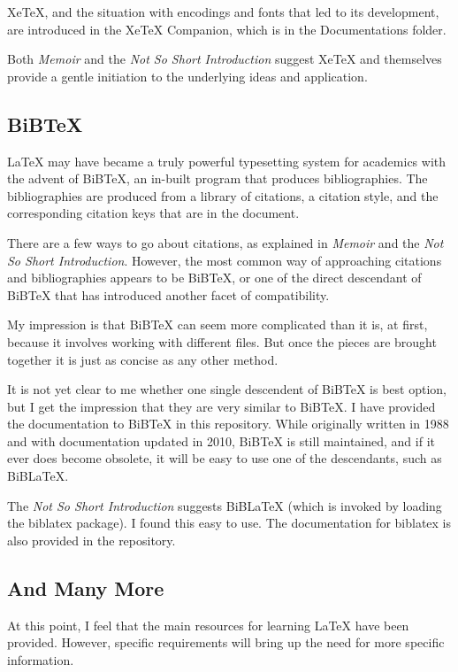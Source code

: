 \documentclass[11pt, oneside]{memoir}
\begin{document}
XeTeX, and the situation with encodings and fonts that led to its development, are introduced in the XeTeX Companion, which is in the Documentations folder.

Both \emph{Memoir} and the \emph{Not So Short Introduction} suggest XeTeX and themselves provide a gentle initiation to the underlying ideas and application.

\subsection{BiBTeX}

LaTeX may have became a truly powerful typesetting system for academics with the advent of BiBTeX, an in-built program that produces bibliographies. The bibliographies are produced from a library of citations, a citation style, and the corresponding citation keys that are in the document.

There are a few ways to go about citations, as explained in \emph{Memoir} and the \emph{Not So Short Introduction}. However, the most common way of approaching citations and bibliographies appears to be BiBTeX, or one of the direct descendant of BiBTeX that has introduced another facet of compatibility.

My impression is that BiBTeX can seem more complicated than it is, at first, because it involves working with different files. But once the pieces are brought together it is just as concise as any other method.

It is not yet clear to me whether one single descendent of BiBTeX is best option, but I get the impression that they are very similar to BiBTeX. I have provided the documentation to BiBTeX in this repository. While originally written in 1988 and with documentation updated in 2010, BiBTeX is still maintained, and if it ever does become obsolete, it will be easy to use one of the descendants, such as BiBLaTeX.

The \emph{Not So Short Introduction} suggests BiBLaTeX (which is invoked by loading the biblatex package). I found this easy to use. The documentation for biblatex is also provided in the repository.

\subsection{And Many More}
At this point, I feel that the main resources for learning LaTeX have been provided. However, specific requirements will bring up the need for more specific information. 
\end{document}

